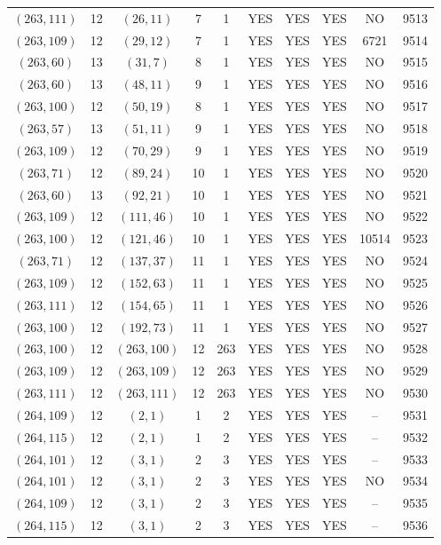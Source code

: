 \begin{longtable}{|c|c|c|c|c|c|c|c|c|c|}
$(263, 111)$ & 12 & $(26, 11)$ & 7 & 1 & YES & YES & YES & NO & 9513\\
$(263, 109)$ & 12 & $(29, 12)$ & 7 & 1 & YES & YES & YES & 6721 & 9514\\
$(263, 60)$ & 13 & $(31, 7)$ & 8 & 1 & YES & YES & YES & NO & 9515\\
$(263, 60)$ & 13 & $(48, 11)$ & 9 & 1 & YES & YES & YES & NO & 9516\\
$(263, 100)$ & 12 & $(50, 19)$ & 8 & 1 & YES & YES & YES & NO & 9517\\
$(263, 57)$ & 13 & $(51, 11)$ & 9 & 1 & YES & YES & YES & NO & 9518\\
$(263, 109)$ & 12 & $(70, 29)$ & 9 & 1 & YES & YES & YES & NO & 9519\\
$(263, 71)$ & 12 & $(89, 24)$ & 10 & 1 & YES & YES & YES & NO & 9520\\
$(263, 60)$ & 13 & $(92, 21)$ & 10 & 1 & YES & YES & YES & NO & 9521\\
$(263, 109)$ & 12 & $(111, 46)$ & 10 & 1 & YES & YES & YES & NO & 9522\\
$(263, 100)$ & 12 & $(121, 46)$ & 10 & 1 & YES & YES & YES & 10514 & 9523\\
$(263, 71)$ & 12 & $(137, 37)$ & 11 & 1 & YES & YES & YES & NO & 9524\\
$(263, 109)$ & 12 & $(152, 63)$ & 11 & 1 & YES & YES & YES & NO & 9525\\
$(263, 111)$ & 12 & $(154, 65)$ & 11 & 1 & YES & YES & YES & NO & 9526\\
$(263, 100)$ & 12 & $(192, 73)$ & 11 & 1 & YES & YES & YES & NO & 9527\\
$(263, 100)$ & 12 & $(263, 100)$ & 12 & 263 & YES & YES & YES & NO & 9528\\
$(263, 109)$ & 12 & $(263, 109)$ & 12 & 263 & YES & YES & YES & NO & 9529\\
$(263, 111)$ & 12 & $(263, 111)$ & 12 & 263 & YES & YES & YES & NO & 9530\\
$(264, 109)$ & 12 & $(2, 1)$ & 1 & 2 & YES & YES & YES & -- & 9531\\
$(264, 115)$ & 12 & $(2, 1)$ & 1 & 2 & YES & YES & YES & -- & 9532\\
$(264, 101)$ & 12 & $(3, 1)$ & 2 & 3 & YES & YES & YES & -- & 9533\\
$(264, 101)$ & 12 & $(3, 1)$ & 2 & 3 & YES & YES & YES & NO & 9534\\
$(264, 109)$ & 12 & $(3, 1)$ & 2 & 3 & YES & YES & YES & -- & 9535\\
$(264, 115)$ & 12 & $(3, 1)$ & 2 & 3 & YES & YES & YES & -- & 9536\\

\end{longtable}
